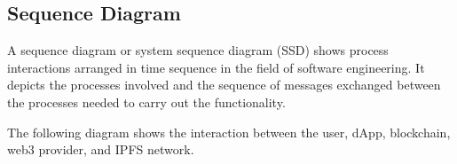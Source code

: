 
\newpage

\subsection{Sequence Diagram}

A sequence diagram or system sequence diagram (SSD) shows process interactions arranged in time sequence in the field of software engineering. It depicts the processes involved and the sequence of messages exchanged between the processes needed to carry out the functionality.

The following diagram shows the interaction between the user, dApp, blockchain, web3 provider, and IPFS network.

